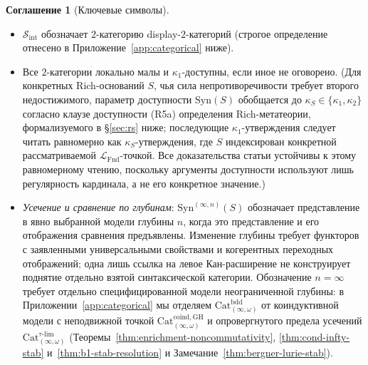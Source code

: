 \documentclass[11pt]{article}
\theoremstyle{plain}
\theoremstyle{definition}
\newtheorem{convention}[theorem]{Соглашение}
\newcommand{\cS}{\mathcal{S}}
\newcommand{\LFnd}{\mathcal{L}_{\mathrm{Fnd}}}
\newcommand{\Sint}{\cS_{\mathrm{int}}}
\newcommand{\Cat}{\mathrm{Cat}}
\newcommand{\Syn}{\mathrm{Syn}}
\begin{document}
\begin{convention}[Ключевые символы]
\begin{itemize}
\item $\Sint$ обозначает $2$-категорию display-$2$-категорий (строгое определение отнесено в Приложение~\ref{app:categorical} ниже).
\item Все $2$-категории локально малы и $\kappa_1$-доступны, если иное не оговорено. (Для конкретных Rich-оснований $S$, чья сила непротиворечивости требует второго недостижимого, параметр доступности $\Syn(S)$ обобщается до $\kappa_S \in \{\kappa_1, \kappa_2\}$ согласно клаузе доступности (R5a) определения Rich-метатеории, формализуемого в \S\ref{sec:rs} ниже; последующие $\kappa_1$-утверждения следует читать равномерно как $\kappa_S$-утверждения, где $S$ индексирован конкретной рассматриваемой $\LFnd$-точкой. Все доказательства статьи устойчивы к этому равномерному чтению, поскольку аргументы доступности используют лишь регулярность кардинала, а не его конкретное значение.)
\item \emph{Усечение и сравнение по глубинам}: $\Syn^{(\infty,n)}(S)$ обозначает представление в явно выбранной модели глубины $n$, когда это представление и его отображения сравнения предъявлены. Изменение глубины требует функторов с заявленными универсальными свойствами и когерентных переходных отображений; одна лишь ссылка на левое Кан-расширение не конструирует поднятие отдельно взятой синтаксической категории. Обозначение $n=\infty$ требует отдельно специфицированной модели неограниченной глубины: в Приложении~\ref{app:categorical} мы отделяем $\Cat_{(\infty,\omega)}^{\mathrm{bdd}}$ от коиндуктивной модели с неподвижной точкой $\Cat_{(\infty,\omega)}^{\mathrm{coind, GH}}$ и опровергнутого предела усечений $\Cat_{(\infty,\omega)}^{\tau\text{-}\mathrm{lim}}$ (Теоремы~\ref{thm:enrichment-noncommutativity}, \ref{thm:cond-infty-stab} и~\ref{thm:b1-stab-resolution} и Замечание~\ref{thm:bergner-lurie-stab}).
\end{itemize}
\end{convention}
\end{document}
